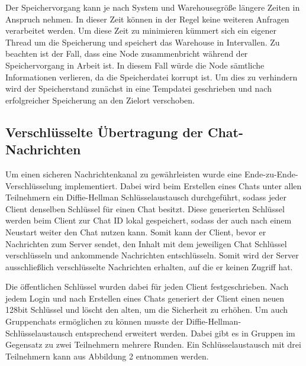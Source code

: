 Der Speichervorgang kann je nach System und Warehousegröße längere Zeiten in Anspruch nehmen. In dieser Zeit können in der Regel keine weiteren Anfragen verarbeitet werden. Um diese Zeit zu minimieren kümmert sich ein eigener Thread um die Speicherung und speichert das Warehouse in Intervallen.
Zu beachten ist der Fall, dass eine Node zusammenbricht während der Speichervorgang in Arbeit ist. In diesem Fall würde die Node sämtliche Informationen verlieren, da die Speicherdatei korrupt ist. Um dies zu verhindern wird der Speicherstand zunächst in eine Tempdatei geschrieben und nach erfolgreicher Speicherung an den Zielort verschoben.

\author{Troy Keßler, Michael Angermeier}
\subsection{Verschlüsselte Übertragung der Chat-Nachrichten}\label{encryption}
Um einen sicheren Nachrichtenkanal zu gewährleisten wurde eine Ende-zu-Ende-Verschlüsselung implementiert. Dabei wird beim Erstellen eines Chats unter allen Teilnehmern ein Diffie-Hellman Schlüsselaustausch durchgeführt, sodass jeder Client denselben Schlüssel für einen Chat besitzt. Diese generierten Schlüssel werden beim Client zur Chat ID lokal gespeichert, sodass der auch nach einem Neustart weiter den Chat nutzen kann. Somit kann der Client, bevor er Nachrichten zum Server sendet, den Inhalt mit dem jeweiligen Chat Schlüssel verschlüsseln und ankommende Nachrichten entschlüsseln. Somit wird der Server ausschließlich verschlüsselte Nachrichten erhalten, auf die er keinen Zugriff hat.

Die öffentlichen Schlüssel wurden dabei für jeden Client festgeschrieben. Nach jedem Login und nach Erstellen eines Chats generiert der Client einen neuen 128bit Schlüssel und löscht den alten, um die Sicherheit zu erhöhen. Um auch Gruppenchats ermöglichen zu können musste der Diffie-Hellman-Schlüsselaustausch entsprechend erweitert werden. Dabei gibt es in Gruppen im Gegensatz zu zwei Teilnehmern mehrere Runden. Ein Schlüsselaustausch mit drei Teilnehmern kann aus Abbildung 2 entnommen werden.


